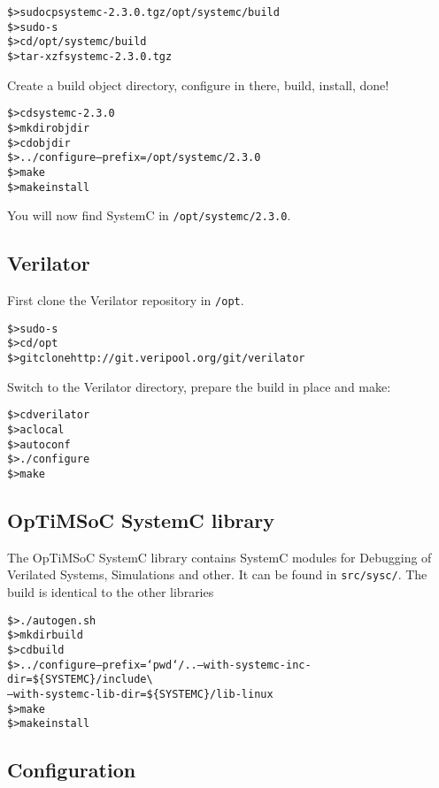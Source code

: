 \begin{alltt}
\$> sudo cp systemc-2.3.0.tgz /opt/systemc/build
\$> sudo -s
\$> cd /opt/systemc/build
\$> tar -xzf systemc-2.3.0.tgz
\end{alltt}

Create a build object directory, configure in there, build, install,
done!

\begin{alltt}
\$> cd systemc-2.3.0
\$> mkdir objdir
\$> cd objdir
\$> ../configure --prefix=/opt/systemc/2.3.0
\$> make
\$> make install
\end{alltt}

You will now find SystemC in \verb|/opt/systemc/2.3.0|.

\subsection{Verilator}

First clone the Verilator repository in \verb|/opt|.

\begin{alltt}
\$> sudo -s
\$> cd /opt
\$> git clone http://git.veripool.org/git/verilator
\end{alltt}

Switch to the Verilator directory, prepare the build in place and make:

\begin{alltt}
\$> cd verilator
\$> aclocal
\$> autoconf
\$> ./configure
\$> make
\end{alltt}

\subsection{OpTiMSoC SystemC library}

The OpTiMSoC SystemC library contains SystemC modules for Debugging of
Verilated Systems, Simulations and other. It can be found in
\verb|src/sysc/|. The build is identical to the other libraries

\begin{alltt}
\$> ./autogen.sh
\$> mkdir build
\$> cd build
\$> ../configure --prefix=`pwd`/.. --with-systemc-inc-dir=\$\{SYSTEMC\}/include \textbackslash
      --with-systemc-lib-dir=\$\{SYSTEMC\}/lib-linux
\$> make
\$> make install
\end{alltt}

\subsection{Configuration}


